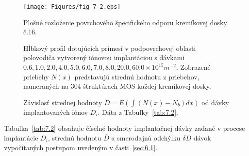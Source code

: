 \begin{figure}[h!]\centering
  \begin{minipage}[c]{\myfiguresize}
    \begin{center}
      \texttt{[image: Figures/fig-7-2.eps]}
    \end{center}
    \caption[Plošné rozloženie povrchového špecifického odporu
      kremíkovej dosky č.16]{Plošné rozloženie povrchového
      špecifického odporu kremíkovej dosky č.16.}\label{fig:7.2}
  \end{minipage}
\end{figure}

\newpage
\begin{figure}[h!]\centering
  \begin{minipage}[c]{\myfiguresize}
    \begin{center}
      
    \end{center}
    \caption[Hĺbkový profil dotujúcich prímesí]{Hĺbkový profil
      dotujúcich prímesí v podpovrchovej oblasti polovodiča vytvorený
      iónovou implantáciou s dávkami $0.6, 1.0, 2.0, 4.0, 5.0, 6.0,
      7.0, 8.0, 20.0, 60.0 \times 10^{15} m^{-2}$. Zobrazené priebehy
      $N(x)$ predstavujú strednú hodnotu z priebehov, nameraných na
      304 štruktúrach MOS každej kremíkovej dosky.}\label{fig:7.3}
  \end{minipage}
\end{figure}

\newpage
\begin{figure}[h!]
  \begin{minipage}[c]{\myfiguresize}
    \begin{center}
      
    \end{center}
    \caption[Závislosť strednej hodnoty
      $\overline{D}=E(\int(N(x)-N_{b})dx)$ od dávky implantovaných
      iónov $D_{i}$]{Závislosť strednej hodnoty
      $\overline{D}=E(\int(N(x)-N_{b})dx)$ od dávky implantovaných
      iónov $D_{i}$. Dáta z Tabuľky~\ref{tab:7.2}.}\label{fig:7.4}
  \end{minipage}
\end{figure}

Tabuľka~\ref{tab:7.2} obsahuje číselné hodnoty implantačnej dávky
zadané v procese implantácie $D_{i}$, strednú hodnotu $\overline D$ a
smerodajnú odchýlku $\delta D$ dávok vypočítaných postupom uvedeným v
časti~\ref{sec:6.1}.

